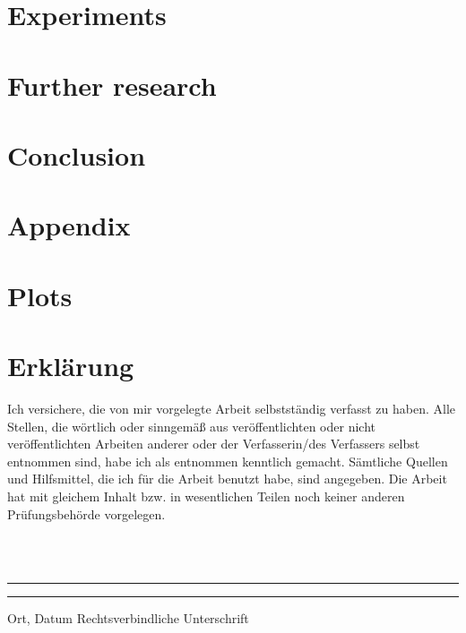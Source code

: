 \documentclass[twoside,11pt]{article}
\begin{document}
\section{Experiments}
\label{sec:experiments}


\section{Further research}
\label{sec:further_research}

\section{Conclusion}

\renewcommand{\appendixpagename}{}
\begin{appendices}
  \section*{Appendix}

  \section{Plots}

\end{appendices}



\newpage
\section*{Erklärung}
Ich versichere, die von mir vorgelegte Arbeit
selbstst\"andig verfasst zu haben.
Alle Stellen, die w\"ortlich oder sinngem\"a{\ss} aus
ver\"offentlichten oder nicht ver\"offentlichten Arbeiten
anderer oder der Verfasserin/des Verfassers selbst
entnommen sind, habe ich als entnommen kenntlich gemacht.
S\"amtliche Quellen und Hilfsmittel, die ich für die Arbeit
benutzt habe, sind angegeben.
Die Arbeit hat mit gleichem Inhalt bzw. in wesentlichen
Teilen noch keiner anderen Pr\"ufungsbeh\"orde vorgelegen.

~\\
~\\
\noindent
\rule{0.35\textwidth}{0.4pt}
\hspace*{3cm}
\rule{0.45\textwidth}{0.4pt}
\newline
Ort, Datum	\hspace*{6.3cm}	Rechtsverbindliche Unterschrift
\end{document}
